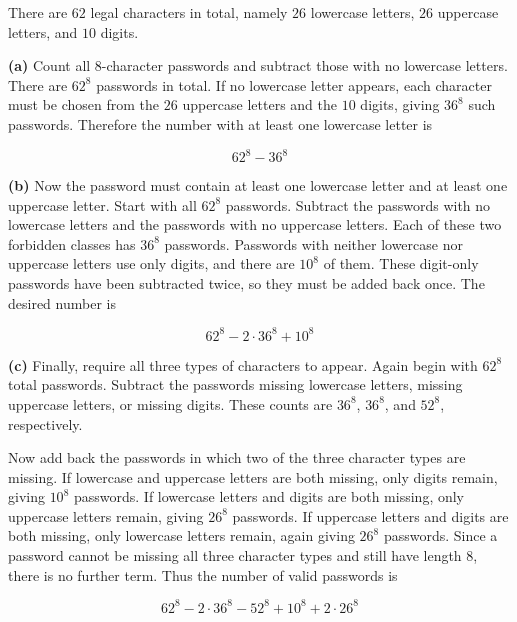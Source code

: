 \documentclass[11pt]{article}
\begin{document}
\begin{solutionbox}
There are \(62\) legal characters in total, namely \(26\) lowercase letters, \(26\) uppercase letters, and \(10\) digits.

\textbf{(a)} Count all 8-character passwords and subtract those with no lowercase letters. There are \(62^8\) passwords in total. If no lowercase letter appears, each character must be chosen from the \(26\) uppercase letters and the \(10\) digits, giving \(36^8\) such passwords. Therefore the number with at least one lowercase letter is

\begin{finalanswerbox}
\[
62^8-36^8
\]
\end{finalanswerbox}

\textbf{(b)} Now the password must contain at least one lowercase letter and at least one uppercase letter. Start with all \(62^8\) passwords. Subtract the passwords with no lowercase letters and the passwords with no uppercase letters. Each of these two forbidden classes has \(36^8\) passwords. Passwords with neither lowercase nor uppercase letters use only digits, and there are \(10^8\) of them. These digit-only passwords have been subtracted twice, so they must be added back once. The desired number is

\begin{finalanswerbox}
\[
62^8-2\cdot 36^8+10^8
\]
\end{finalanswerbox}

\textbf{(c)} Finally, require all three types of characters to appear. Again begin with \(62^8\) total passwords. Subtract the passwords missing lowercase letters, missing uppercase letters, or missing digits. These counts are \(36^8\), \(36^8\), and \(52^8\), respectively.

Now add back the passwords in which two of the three character types are missing. If lowercase and uppercase letters are both missing, only digits remain, giving \(10^8\) passwords. If lowercase letters and digits are both missing, only uppercase letters remain, giving \(26^8\) passwords. If uppercase letters and digits are both missing, only lowercase letters remain, again giving \(26^8\) passwords. Since a password cannot be missing all three character types and still have length 8, there is no further term. Thus the number of valid passwords is
\begin{finalanswerbox}
\[
62^8-2\cdot 36^8-52^8+10^8+2\cdot 26^8
\]
\end{finalanswerbox}
\end{solutionbox}
\end{document}
